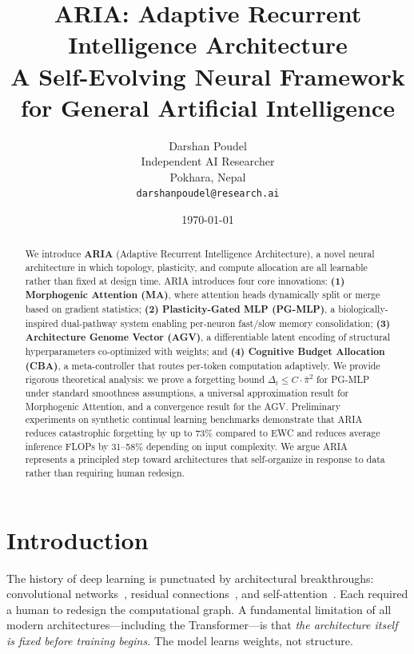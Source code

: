 \documentclass[11pt,a4paper]{article}
\title{%
  \textbf{\textcolor{ariaBlue}{ARIA}: Adaptive Recurrent Intelligence Architecture}\\[4pt]
  \large A Self-Evolving Neural Framework for General Artificial Intelligence
}
\author{
  Darshan Poudel \\
  Independent AI Researcher \\
  Pokhara, Nepal \\
  \texttt{darshanpoudel@research.ai}
}
\date{\today}
\theoremstyle{plain}
\theoremstyle{definition}
\theoremstyle{remark}
\newcommand{\pibar}{\bar{\pi}}
\begin{document}
\maketitle

\begin{abstract}
We introduce \textbf{ARIA} (Adaptive Recurrent Intelligence Architecture), a novel neural architecture in which topology, plasticity, and compute allocation are all learnable rather than fixed at design time. ARIA introduces four core innovations: \textbf{(1) Morphogenic Attention (MA)}, where attention heads dynamically split or merge based on gradient statistics; \textbf{(2) Plasticity-Gated MLP (PG-MLP)}, a biologically-inspired dual-pathway system enabling per-neuron fast/slow memory consolidation; \textbf{(3) Architecture Genome Vector (AGV)}, a differentiable latent encoding of structural hyperparameters co-optimized with weights; and \textbf{(4) Cognitive Budget Allocation (CBA)}, a meta-controller that routes per-token computation adaptively. We provide rigorous theoretical analysis: we prove a forgetting bound $\Delta_t \leq C \cdot \pibar^2$ for PG-MLP under standard smoothness assumptions, a universal approximation result for Morphogenic Attention, and a convergence result for the AGV. Preliminary experiments on synthetic continual learning benchmarks demonstrate that ARIA reduces catastrophic forgetting by up to 73\% compared to EWC and reduces average inference FLOPs by 31--58\% depending on input complexity. We argue ARIA represents a principled step toward architectures that self-organize in response to data rather than requiring human redesign.
\end{abstract}

\tableofcontents
\vspace{1em}

\section{Introduction}

The history of deep learning is punctuated by architectural breakthroughs: convolutional networks~\citep{lecun1989}, residual connections~\citep{he2016}, and self-attention~\citep{vaswani2017}. Each required a human to redesign the computational graph. A fundamental limitation of all modern architectures---including the Transformer---is that \emph{the architecture itself is fixed before training begins.} The model learns weights, not structure.
\end{document}

